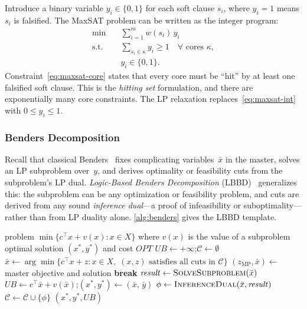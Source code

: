 Introduce a binary variable $y_i \in \{0,1\}$ for each soft clause $s_i$,
where $y_i = 1$ means $s_i$ is falsified. The MaxSAT problem can be written as
the integer program:
\begin{align}
\min \quad & \sum_{i=1}^{m} w(s_i)\, y_i \label{eq:maxsat-obj}\\
\text{s.t.} \quad & \sum_{s_i \in \kappa} y_i \geq 1 \quad \forall \text{ cores } \kappa, \label{eq:maxsat-core}\\
& y_i \in \{0,1\}. \label{eq:maxsat-int}
\end{align}
Constraint~\eqref{eq:maxsat-core} states that every core must be ``hit'' by
at least one falsified soft clause. This is the \emph{hitting set}
formulation, and there are exponentially many core constraints. The LP
relaxation replaces~\eqref{eq:maxsat-int} with $0 \leq y_i \leq 1$.

\subsubsection{Benders Decomposition}

Recall that classical Benders~\citep{benders1962partitioning} fixes
complicating variables~$\bar{x}$ in the master, solves an LP subproblem
over~$y$, and derives optimality or feasibility cuts from the subproblem's LP
dual. \emph{Logic-Based Benders Decomposition} (LBBD)~\citep{hooker2003logic,hooker2024book}
generalizes this: the subproblem can be any optimization or feasibility
problem, and cuts are derived from any sound \emph{inference dual}---a proof
of infeasibility or suboptimality---rather than from LP duality alone.
\cref{alg:benders} gives the LBBD template.

\begin{algorithm}[t]
\caption{Logic-Based Benders Decomposition (LBBD)}
\label{alg:benders}
\begin{algorithmic}[1]
\Require problem $\min\{c^{\top}x + v(x) : x \in X\}$ where $v(x)$ is the value of a subproblem
\Ensure optimal solution $(x^*, y^*)$ and cost $\mathit{OPT}$
\State $\mathit{UB} \leftarrow +\infty$;\quad $\mathcal{C} \leftarrow \emptyset$ 
\Loop
    \State $\bar{x} \leftarrow \arg\min\{c^{\top}x + z : x \in X,\; (x,z) \text{ satisfies all cuts in } \mathcal{C}\}$
    \State $(z_\mathrm{MP}, \bar{x}) \leftarrow$ master objective and solution
     \textbf{break} \EndIf {}
    \State $\mathit{result} \leftarrow \textsc{SolveSubproblem}(\bar{x})$
        \State $\mathit{UB} \leftarrow c^{\top}\bar{x} + v(\bar{x})$;\quad $(x^*, y^*) \leftarrow (\bar{x},\, \bar{y})$
    \EndIf
    \State $\phi \leftarrow \textsc{InferenceDual}(\bar{x}, \mathit{result})$
    \State $\mathcal{C} \leftarrow \mathcal{C} \cup \{\phi\}$
\EndLoop
\State \Return $(x^*, y^*, \mathit{UB})$
\end{algorithmic}
\end{algorithm}

